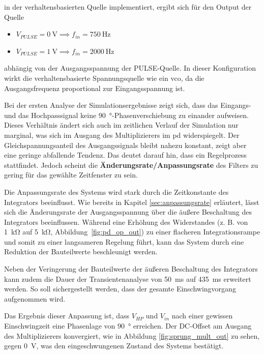 \documentclass[../main_config.tex]{subfiles}
\begin{document}
in der verhaltensbasierten Quelle implementiert, ergibt sich für den Output der Quelle\par
\medskip

\begin{itemize} 
    \item $V_{PULSE} = \SI{0}{\volt} \implies f_{in} = \SI{750}{\hertz}$ 
    \item $V_{PULSE} = \SI{1}{\volt} \implies f_{in} = \SI{2000}{\hertz}$ 
\end{itemize}

abhängig von der Ausgangsspannung der PULSE-Quelle. In dieser Konfiguration wirkt die verhaltensbasierte Spannungsquelle wie ein \gls{vco}, da die Ausgangsfrequenz proportional zur Eingangsspannung ist. \par
\medskip 

Bei der ersten Analyse der Simulationsergebnisse zeigt sich, dass das Eingangs- und das Hochpasssignal keine \SI{90}{\degree}-Phasenverschiebung zu einander aufweisen. Dieses Verhältnis ändert sich auch im zeitlichen Verlauf der Simulation nur marginal, was sich im Ausgang des Multiplizierers im \gls{pd} widerspiegelt. Der Gleichspannungsanteil des Ausgangssignals bleibt nahezu konstant, zeigt aber eine geringe abfallende Tendenz. Das deutet darauf hin, dass ein Regelprozess stattfindet. Jedoch scheint die \textbf{Änderungsrate/Anpassungsrate} des Filters zu gering für das gewählte Zeitfenster zu sein.\par
\medskip

Die Anpassungsrate des Systems wird stark durch die Zeitkonstante des Integrators beeinflusst. Wie bereits in Kapitel \ref{sec:anpassungsrate} erläutert, lässt sich die Änderungsrate der Ausgangsspannung über die äußere Beschaltung des Integrators beeinflussen. Während eine Erhöhung des Widerstandes (z. B. von \SI{1}{\kilo\ohm} auf \SI{5}{\kilo\ohm}, Abbildung~\ref{fig:pd_op_out}) zu einer flacheren Integrationsrampe und somit zu einer langsameren Regelung führt, kann das System durch eine Reduktion der Bauteilwerte beschleunigt werden.\par
\medskip

Neben der Veringerung der Bauteilwerte der äußeren Beschaltung des Integrators kann zudem die Dauer der Transientenanalyse von \SI{50}{\milli\second} auf \SI{435}{\milli\second} erweitert werden. So soll sichergestellt werden, dass der gesamte Einschwingvorgang aufgenommen wird.\par
\medskip

Das Ergebnis dieser Anpassung ist, dass $V_{HP}$ und $V_{in}$ nach einer gewissen Einschwingzeit eine Phasenlage von \SI{90}{\degree} erreichen. Der DC-Offset am Ausgang des Multiplizierers konvergiert, wie in Abbildung \ref{fig:sprung_mult_out} zu sehen, gegen \SI{0}{\volt}, was den eingeschwungenen Zustand des Systems bestätigt.\par
\medskip
\end{document}
